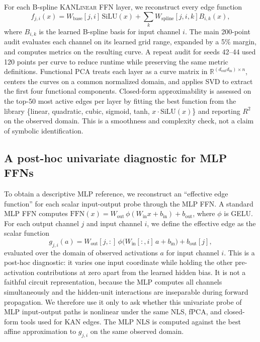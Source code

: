 \documentclass{article}
\newcommand{\modelname}[1]{\textsc{#1}}
\newcommand{\kanlinear}{\modelname{KANLinear}}
\begin{document}
For each B-spline \kanlinear{} FFN layer, we reconstruct every edge function
\[
f_{j,i}(x)=W_{\mathrm{base}}[j,i]\,\mathrm{SiLU}(x)+\sum_k W_{\mathrm{spline}}[j,i,k]B_{i,k}(x),
\]
where \(B_{i,k}\) is the learned B-spline basis for input channel \(i\). The main 200-point audit evaluates each channel on its learned grid range, expanded by a 5\% margin, and computes metrics on the resulting curve. A repeat audit for seeds 42--44 used 120 points per curve to reduce runtime while preserving the same metric definitions. Functional PCA treats each layer as a curve matrix in \(\mathbb{R}^{(d_{\mathrm{out}}d_{\mathrm{in}})\times n}\), centers the curves on a common normalized domain, and applies SVD to extract the first four functional components. Closed-form approximability is assessed on the top-50 most active edges per layer by fitting the best function from the library \{linear, quadratic, cubic, sigmoid, tanh, \(x\cdot\mathrm{SiLU}(x)\)\} and reporting \(R^2\) on the observed domain. This is a smoothness and complexity check, not a claim of symbolic identification.

\subsection{A post-hoc univariate diagnostic for MLP FFNs}
\label{sec:mlp-edge}

To obtain a descriptive MLP reference, we reconstruct an ``effective edge function'' for each scalar input-output probe through the MLP FFN. A standard MLP FFN computes \(\mathrm{FFN}(x)=W_{\mathrm{out}}\,\phi(W_{\mathrm{in}}x+b_{\mathrm{in}})+b_{\mathrm{out}}\), where \(\phi\) is GELU. For each output channel \(j\) and input channel \(i\), we define the effective edge as the scalar function
\[
g_{j,i}(a)=W_{\mathrm{out}}[j,:]\,\phi\bigl(W_{\mathrm{in}}[:,i]\,a+b_{\mathrm{in}}\bigr)+b_{\mathrm{out}}[j],
\]
evaluated over the domain of observed activations \(a\) for input channel \(i\). This is a post-hoc diagnostic: it varies one input coordinate while holding the other pre-activation contributions at zero apart from the learned hidden bias. It is not a faithful circuit representation, because the MLP computes all channels simultaneously and the hidden-unit interactions are inseparable during forward propagation. We therefore use it only to ask whether this univariate probe of MLP input-output paths is nonlinear under the same NLS, fPCA, and closed-form tools used for KAN edges. The MLP NLS is computed against the best affine approximation to \(g_{j,i}\) on the same observed domain.
\end{document}
